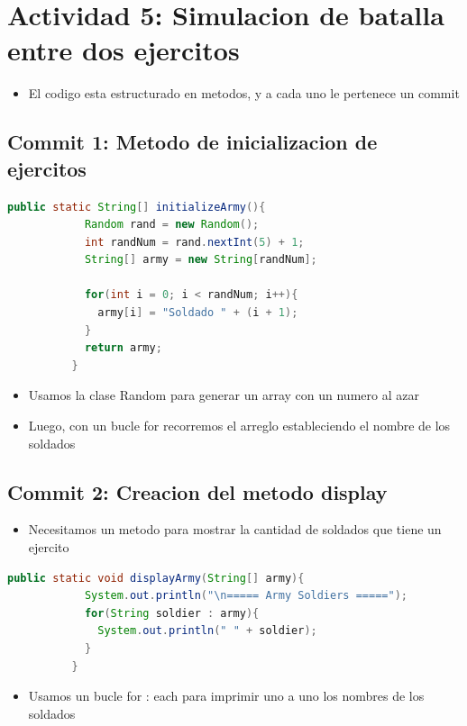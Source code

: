 \documentclass{article}
\begin{document}
        \section{Actividad 5: Simulacion de batalla entre dos ejercitos}
        \begin{itemize}
            \item El codigo esta estructurado en metodos, y a cada uno le pertenece un commit
        \end{itemize}
            \subsection{Commit 1: Metodo de inicializacion de ejercitos}
            \begin{lstlisting}[language=java, caption={Metodo initializeArmy()}]
          public static String[] initializeArmy(){
            Random rand = new Random();
            int randNum = rand.nextInt(5) + 1;
            String[] army = new String[randNum];
        
            for(int i = 0; i < randNum; i++){
              army[i] = "Soldado " + (i + 1);
            }
            return army;
          }
            \end{lstlisting}
        \begin{itemize}
            \item Usamos la clase Random para generar un array con un numero al azar
            \item Luego, con un bucle for recorremos el arreglo estableciendo el nombre de los soldados
            
        \end{itemize}
        \subsection{Commit 2: Creacion del metodo display}
        \begin{itemize}
            \item Necesitamos un metodo para mostrar la cantidad de soldados que tiene un ejercito
        \end{itemize}
        \begin{lstlisting}[language=java, caption={Metodo display()}]
          public static void displayArmy(String[] army){
            System.out.println("\n===== Army Soldiers =====");
            for(String soldier : army){
              System.out.println(" " + soldier);
            }
          }
        \end{lstlisting}
        \begin{itemize}
            \item Usamos un bucle for : each para imprimir uno a uno los nombres de los soldados
        \end{itemize}
\end{document}
